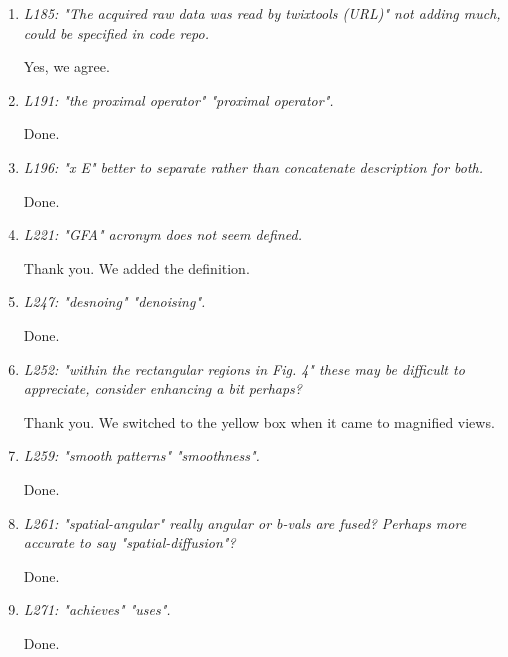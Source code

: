 \documentclass[a4paper,11pt,twoside]{report}
\begin{document}
\begin{enumerate}[resume]
    \item \textit{L185: "The acquired raw data was read by twixtools (URL)" \textrightarrow not adding much, could be specified in code repo.}

    \hspace{1em} Yes, we agree.

    \item \textit{L191: "the proximal operator" \textrightarrow "proximal operator".}

    \hspace{1em} Done.

    \item \textit{L196: "x E" \textrightarrow better to separate rather than concatenate description for both.}

    \hspace{1em} Done.

    \item \textit{L221: "GFA" \textrightarrow acronym does not seem defined.}

    \hspace{1em} Thank you. We added the definition.

    \item \textit{L247: "desnoing" \textrightarrow "denoising".}

    \hspace{1em} Done.

    \item \textit{L252: "within the rectangular regions in Fig. 4" \textrightarrow these may be difficult to appreciate, consider enhancing a bit perhaps?}

    \hspace{1em} Thank you. We switched to the yellow box
    when it came to magnified views.

    \item \textit{L259: "smooth patterns" \textrightarrow "smoothness".}

    \hspace{1em} Done.

    \item \textit{L261: "spatial-angular" \textrightarrow really angular or b-vals are fused? Perhaps more accurate to say "spatial-diffusion"?}

    \hspace{1em} Done.

    \item \textit{L271: "achieves" \textrightarrow "uses".}

    \hspace{1em} Done.

\end{enumerate}
\end{document}
